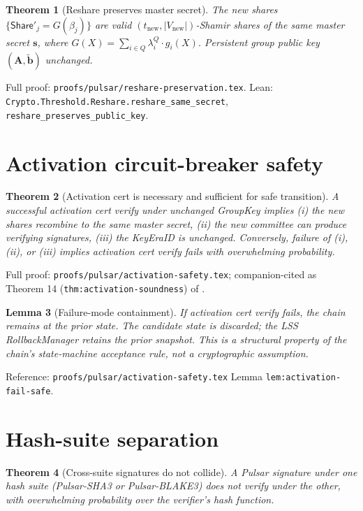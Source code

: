\documentclass[11pt,a4paper]{article}
\newtheorem{theorem}{Theorem}
\newtheorem{lemma}[theorem]{Lemma}
\begin{document}
\begin{theorem}[Reshare preserves master secret]
The new shares $\{\mathsf{Share}'_j = G(\beta_j)\}$ are valid $(t_{\mathrm{new}}, |V_{\mathrm{new}}|)$-Shamir shares of the same master secret $\mathbf{s}$, where $G(X) = \sum_{i \in Q} \lambda^Q_i \cdot g_i(X)$. Persistent group public key $(\mathbf{A}, \tilde{\mathbf{b}})$ unchanged.
\end{theorem}

Full proof: \texttt{proofs/pulsar/reshare-preservation.tex}. Lean: \texttt{Crypto.Threshold.Reshare.reshare\_same\_secret}, \texttt{reshare\_preserves\_public\_key}.

\section{Activation circuit-breaker safety}

\begin{theorem}[Activation cert is necessary and sufficient for safe transition]
A successful activation cert verify under unchanged GroupKey implies (i) the new shares recombine to the same master secret, (ii) the new committee can produce verifying signatures, (iii) the KeyEraID is unchanged. Conversely, failure of (i), (ii), or (iii) implies activation cert verify fails with overwhelming probability.
\end{theorem}

Full proof: \texttt{proofs/pulsar/activation-safety.tex}; companion-cited as Theorem 14 (\texttt{thm:activation-soundness}) of \cite{quasarcertsoundness}.

\begin{lemma}[Failure-mode containment]
If activation cert verify fails, the chain remains at the prior state. The candidate state is discarded; the LSS RollbackManager retains the prior snapshot. This is a structural property of the chain's state-machine acceptance rule, not a cryptographic assumption.
\end{lemma}

Reference: \texttt{proofs/pulsar/activation-safety.tex} Lemma \texttt{lem:activation-fail-safe}.

\section{Hash-suite separation}

\begin{theorem}[Cross-suite signatures do not collide]
A Pulsar signature under one hash suite (Pulsar-SHA3 or Pulsar-BLAKE3) does not verify under the other, with overwhelming probability over the verifier's hash function.
\end{theorem}
\end{document}
